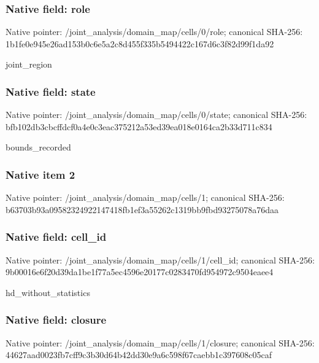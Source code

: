 \documentclass[10pt,a4paper]{article}
\begin{document}
\subsubsection{Native field: role}


Native pointer: /joint\_analysis/domain\_map/cells/0/role; canonical SHA-256: 1b1fe0e945e26ad153b0c6e5\allowbreak{}a2c8d455f335b5494422c167\allowbreak{}d6c3f82d99f1da92


joint\_region


\subsubsection{Native field: state}


Native pointer: /joint\_analysis/domain\_m\allowbreak{}ap/cells/0/state; canonical SHA-256: bfb102db3cbcffdcf0a4e0c3\allowbreak{}eac375212a53ed39ea018e01\allowbreak{}64ca2b33d711c834


bounds\_recorded


\subsubsection{Native item 2}


Native pointer: /joint\_analysis/domain\_map/cells/1; canonical SHA-256: b63703b93a09582324922147\allowbreak{}418fb1ef3a55262c1319bb9f\allowbreak{}bd93275078a76daa



\subsubsection{Native field: cell\_id}


Native pointer: /joint\_analysis/domain\_m\allowbreak{}ap/cells/1/cell\_id; canonical SHA-256: 9b00016e6f20d39da1be1f77\allowbreak{}a5ec4596e20177c0283470fd\allowbreak{}954972c9504eaee4


hd\_without\_statistics


\subsubsection{Native field: closure}


Native pointer: /joint\_analysis/domain\_m\allowbreak{}ap/cells/1/closure; canonical SHA-256: 44627aad0023fb7cff9c3b30\allowbreak{}d64b42dd30e9a6c598f67cae\allowbreak{}bb1c397608c05caf
\end{document}
